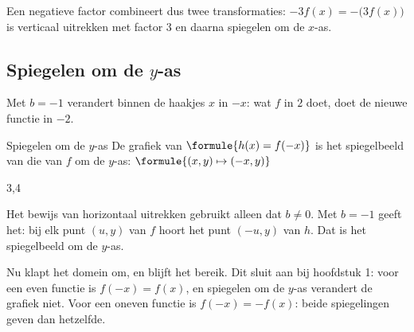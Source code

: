 Een negatieve factor combineert dus twee transformaties: $-3f(x) = -\bigl(3f(x)\bigr)$ is verticaal uitrekken met factor $3$ en daarna spiegelen om de $x$-as.


\subsection{Spiegelen om de $y$-as}

Met $b = -1$ verandert binnen de haakjes $x$ in $-x$: wat $f$ in $2$ doet, doet de nieuwe functie in $-2$.

\begin{theorie}
\begin{stelling}{Spiegelen om de $y$-as}
De grafiek van $\formule{h(x) = f(-x)}$ is het spiegelbeeld van die van $f$ om de $y$-as: \quad $\formule{(x, y) \mapsto (-x, y)}$
\end{stelling}

\begin{alleenvoor}{3,4}
\begin{bewijs}
Het bewijs van horizontaal uitrekken gebruikt alleen dat $b \neq 0$. Met $b = -1$ geeft het: bij elk punt $(u, y)$ van $f$ hoort het punt $(-u, y)$ van $h$. Dat is het spiegelbeeld om de $y$-as.
\end{bewijs}
\end{alleenvoor}
\end{theorie}

Nu klapt het domein om, en blijft het bereik. Dit sluit aan bij hoofdstuk 1: voor een even functie is $f(-x) = f(x)$, en spiegelen om de $y$-as verandert de grafiek niet. Voor een oneven functie is $f(-x) = -f(x)$: beide spiegelingen geven dan hetzelfde.

